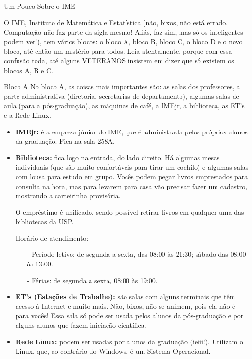 \begin{secao}{Um Pouco Sobre o IME}

O IME, Instituto de Matemática e Estatística (não, bixos, não está errado. 
Computação não faz parte da sigla mesmo! Aliás, faz sim, mas só os inteligentes 
podem ver!), tem vários blocos: o bloco A, bloco B, bloco C, o bloco D e o 
novo bloco, até então um mistério para todos. Leia atentamente, porque com essa 
confusão toda, até alguns VETERANOS insistem em dizer que só existem os blocos A, B e C.

\begin{subsecao}{Bloco A}
No bloco A, as coisas mais importantes são: as salas dos professores, a parte
administrativa (diretoria, secretarias de departamento), algumas salas de aula
(para a pós-graduação), as máquinas de café, a IMEjr, a biblioteca, as ET's e
a Rede Linux.

\begin{itemize}

\item {\bf IMEjr:} é a empresa júnior do IME, que é administrada pelos próprios
alunos da graduação. Fica na sala 258A.

\item {\bf Biblioteca:} fica logo na entrada, do lado direito. Há algumas mesas
individuais (que são muito confortáveis para tirar um cochilo) e algumas salas
com lousa para estudo em grupo. Vocês podem pegar livros emprestados para consulta
na hora, mas para levarem para casa vão precisar fazer um cadastro, mostrando a
carteirinha provisória.

O empréstimo é unificado, sendo possível retirar livros em qualquer uma das bibliotecas da USP.

Horário de atendimento:
\begin{itemize}
\item[-] Período letivo: de segunda a sexta, das 08:00 às 21:30; sábado das 08:00 às 13:00.
\item[-] Férias: de segunda a sexta, 08:00 às 19:00.
\end{itemize}

\item {\bf ET's (Estações de Trabalho):} são salas com alguns terminais que têm
acesso à Internet e muito mais. Não, bixos, não se animem, pois ela não é para
vocês! Essa sala só pode ser usada pelos alunos da pós-graduação e por alguns
alunos que fazem iniciação científica.

\item {\bf Rede Linux:} podem ser usadas por alunos da graduação (ieiii!).
Utilizam o Linux, que, ao contrário do Windows, é um Sistema Operacional.


\end{itemize}
\end{subsecao}
\end{secao}
